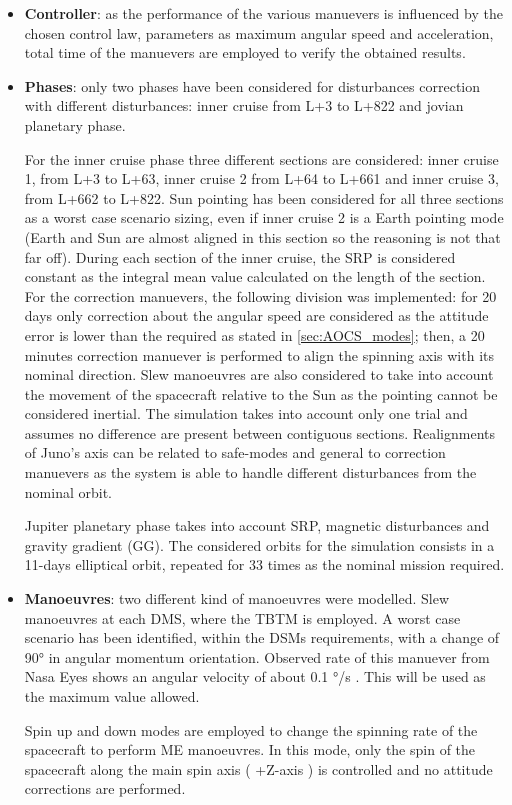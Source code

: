 \begin{itemize}
    \item \textbf{Controller}: as the performance of the various manuevers is influenced by the chosen control law, parameters as maximum angular speed and acceleration, total time of the manuevers are employed to verify the obtained results. 
    
    \item \textbf{Phases}: only two phases have been considered for disturbances correction with different disturbances: inner cruise from L+3 to L+822 and jovian planetary phase. 
    
    For the inner cruise phase three different sections are considered: inner cruise 1, from L+3 to L+63, inner cruise 2 from L+64 to L+661 and inner cruise 3, from L+662 to L+822. Sun pointing has been considered for all three sections as a worst case scenario sizing, even if inner cruise 2 is a Earth pointing mode (Earth and Sun are almost aligned in this section so the reasoning is not that far off). During each section of the inner cruise, the SRP is considered constant as the integral mean value calculated on the length of the section.
     For the correction manuevers, the following division was implemented: for 20 days only correction about the angular speed are considered as the attitude error is lower than the required as stated in \autoref{sec:AOCS_modes}; then, a 20 minutes correction manuever is performed to align the spinning axis with its nominal direction. Slew manoeuvres are also considered to take into account the movement of the spacecraft relative to the Sun as the pointing cannot be considered inertial. The simulation takes into account only one trial and assumes no difference are present between contiguous sections. Realignments of Juno's axis can be related to safe-modes and general to correction manuevers as the system is able to handle different disturbances from the nominal orbit. 
    
    Jupiter planetary phase takes into account SRP, magnetic disturbances and gravity gradient (GG). The considered orbits for the simulation consists in a 11-days elliptical orbit, repeated for 33 times as the nominal mission required. 

    \item \textbf{Manoeuvres}: two different kind of manoeuvres were modelled. Slew manoeuvres at each DMS, where the TBTM is employed. A worst case scenario has been identified, within the DSMs requirements, with a change of 90° in angular momentum orientation. Observed rate of this manuever from Nasa Eyes\cite{nasa_eyes} shows an angular velocity of about 0.1 °/s \cite{slides_michele}. This will be used as the maximum value allowed. 
    
    Spin up and down modes are employed to change the spinning rate of the spacecraft to perform ME manoeuvres. In this mode, only the spin of the spacecraft along the main spin axis ( +Z-axis ) is controlled and no attitude corrections are performed.      

\end{itemize}


